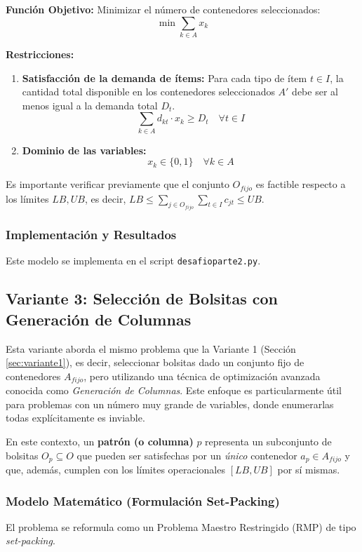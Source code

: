 \documentclass[a4paper,12pt]{article}
\begin{document}
\textbf{Función Objetivo:}
Minimizar el número de contenedores seleccionados:
\[ \min \sum_{k \in A} x_k \]

\textbf{Restricciones:}
\begin{enumerate}
    \item \textbf{Satisfacción de la demanda de ítems:} Para cada tipo de ítem $t \in I$, la cantidad total disponible en los contenedores seleccionados $A'$ debe ser al menos igual a la demanda total $D_t$.
    \[ \sum_{k \in A} d_{kt} \cdot x_k \ge D_t \quad \forall t \in I \]
    \item \textbf{Dominio de las variables:}
    \[ x_k \in \{0, 1\} \quad \forall k \in A \]
\end{enumerate}
Es importante verificar previamente que el conjunto $O_{fijo}$ es factible respecto a los límites $LB, UB$, es decir, $LB \le \sum_{j \in O_{fijo}} \sum_{t \in I} c_{jt} \le UB$.

\subsubsection{Implementación y Resultados}
Este modelo se implementa en el script \texttt{desafioparte2.py}.

\subsection{Variante 3: Selección de Bolsitas con Generación de Columnas}
\label{sec:variante3}
Esta variante aborda el mismo problema que la Variante 1 (Sección \ref{sec:variante1}), es decir, seleccionar bolsitas dado un conjunto fijo de contenedores $A_{fijo}$, pero utilizando una técnica de optimización avanzada conocida como \emph{Generación de Columnas}. Este enfoque es particularmente útil para problemas con un número muy grande de variables, donde enumerarlas todas explícitamente es inviable.

En este contexto, un \textbf{patrón (o columna)} $p$ representa un subconjunto de bolsitas $O_p \subseteq O$ que pueden ser satisfechas por un \emph{único} contenedor $a_p \in A_{fijo}$ y que, además, cumplen con los límites operacionales $[LB, UB]$ por sí mismas.

\subsubsection{Modelo Matemático (Formulación Set-Packing)}
El problema se reformula como un Problema Maestro Restringido (RMP) de tipo \emph{set-packing}.
\end{document}
